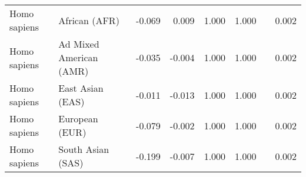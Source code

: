 \begin{center}
\begin{adjustbox}{width = 1\textwidth}
\begin{tabular}{|l|l|r|r|r|r|r|}
        Homo sapiens &                   African (AFR) &                                             -0.069 &                                              0.009 &                1.000 &                                  1.000~~ &              0.002 \\
        Homo sapiens &         Ad Mixed American (AMR) &                                             -0.035 &                                             -0.004 &                1.000 &                                  1.000~~ &              0.002 \\
        Homo sapiens &                East Asian (EAS) &                                             -0.011 &                                             -0.013 &                1.000 &                                  1.000~~ &              0.002 \\
        Homo sapiens &                  European (EUR) &                                             -0.079 &                                             -0.002 &                1.000 &                                  1.000~~ &              0.002 \\
        Homo sapiens &               South Asian (SAS) &                                             -0.199 &                                             -0.007 &                1.000 &                                  1.000~~ &              0.002 \\
\bottomrule
\end{tabular}
\end{adjustbox}
\newpage
\end{center}